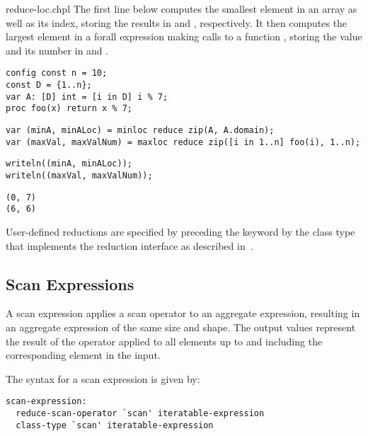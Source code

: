 \begin{chapelexample}{reduce-loc.chpl}
The first line below computes the smallest element in an array
 as well as its index, storing the results in  and
, respectively.  It then computes the largest element in
a forall expression making calls to a function , storing
the value and its number in  and .
\begin{chapelnoprint}
\begin{verbatim}
config const n = 10;
const D = {1..n};
var A: [D] int = [i in D] i % 7;
proc foo(x) return x % 7;
\end{verbatim}
\end{chapelnoprint}
\begin{chapel}
\begin{verbatim}
var (minA, minALoc) = minloc reduce zip(A, A.domain); 
var (maxVal, maxValNum) = maxloc reduce zip([i in 1..n] foo(i), 1..n);
\end{verbatim}
\end{chapel}
\begin{chapelnoprint}
\begin{verbatim}
writeln((minA, minALoc));
writeln((maxVal, maxValNum));
\end{verbatim}
\end{chapelnoprint}
\begin{chapeloutput}
\begin{verbatim}
(0, 7)
(6, 6)
\end{verbatim}
\end{chapeloutput}
\end{chapelexample}

User-defined reductions are specified by preceding the
keyword  by the class type that implements the reduction
interface as described in~.

\subsection{Scan Expressions}
\label{scan}

A scan expression applies a scan operator to an aggregate expression,
resulting in an aggregate expression of the same size and shape.  The
output values represent the result of the operator applied to all
elements up to and including the corresponding element in the input.

The syntax for a scan expression is given by:
\begin{syntax}
\begin{verbatim}
scan-expression:
  reduce-scan-operator `scan' iteratable-expression
  class-type `scan' iteratable-expression
\end{verbatim}
\end{syntax}

